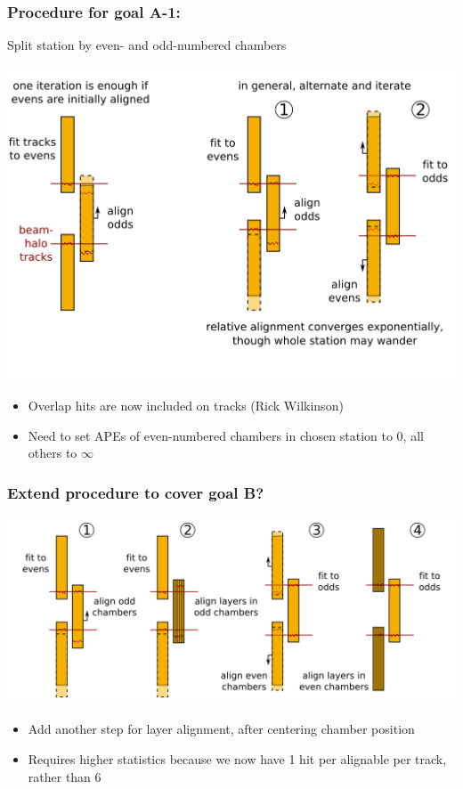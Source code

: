 \documentclass[compress]{beamer}
\begin{document}
\begin{frame}
\frametitle{Procedure for goal A-1:}
Split station by even- and odd-numbered chambers

\vspace{-0.25 cm}
\begin{center} \includegraphics[width=0.9\linewidth]{illustration-A1.png} \end{center}

\vspace{-1 cm}
\begin{itemize}
\item Overlap hits are now included on tracks (Rick Wilkinson)
\item Need to set APEs of even-numbered chambers in chosen station to 0, all others to $\infty$
\end{itemize}
\end{frame}

\begin{frame}
\frametitle{Extend procedure to cover goal B?}
\begin{center} \includegraphics[width=\linewidth]{illustration-B.png} \end{center}

\begin{itemize}
\item Add another step for layer alignment, after centering chamber position
\item Requires higher statistics because we now have 1 hit per alignable per track, rather than 6
\end{itemize}
\end{frame}
\end{document}

